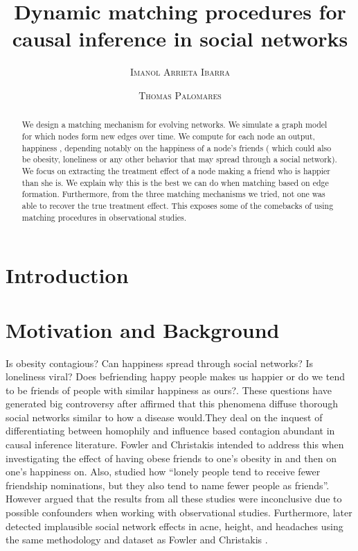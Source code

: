 \documentclass[11pt]{article}
\title{Dynamic matching procedures for causal inference in social networks}
\author{{\textsc{Imanol Arrieta Ibarra}} \\
 \and {\textsc{Thomas Palomares}} \\
}
\begin{document}
\maketitle


\begin{abstract}
We design a matching mechanism for evolving networks. We simulate a graph model for which nodes form new edges over time. We compute for each node an output, happiness , depending notably on the happiness of a node's friends ( which could also be obesity, loneliness or any other behavior that may spread through a social network). We focus on extracting the treatment effect of a node making a friend who is happier than she is. We explain why this is the best we can do when matching based on edge formation. Furthermore, from the three matching mechanisms we tried, not one was able to recover the true treatment effect. This exposes some of the comebacks of using matching procedures in observational studies. 

\end{abstract}

\newpage

\section{Introduction}




\section{Motivation and Background}

Is obesity contagious? Can happiness spread through social networks? Is loneliness viral? Does befriending happy people makes us happier or do we tend to be friends of people with similar happiness as ours?. These questions have generated big controversy after \cite{christakis2007spread} affirmed that this phenomena diffuse thorough social networks similar to how a disease would.They deal on  the inquest of differentiating between homophily and influence based contagion abundant in causal inference literature. Fowler and Christakis intended to address this when investigating the effect of having obese friends to one’s obesity in \citep{christakis2007spread} and then on one’s happiness on. Also, \citep{cacioppo2009alone} studied how “lonely people tend to receive fewer friendship nominations, but they also tend to name fewer people as friends”. However \citep{shalizi2011homophily} argued that the results from all these studies were inconclusive due to possible confounders when working with observational studies. Furthermore, \citep{cohen2008detecting} later detected implausible social network effects in acne, height, and headaches using the same methodology and dataset as Fowler and Christakis . \\
\end{document}
